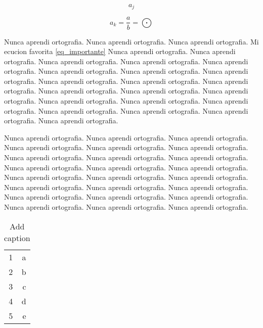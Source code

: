 \documentclass[13pt]{article}
\begin{document}
$$a_j$$

\begin{equation}
a_k = \frac{a}{b} = \bigodot
\label{eq_importante}
\end{equation}

        Nunca aprendi ortografia. Nunca aprendi ortografia. Nunca aprendi ortografia. Mi ecucion favorita \ref{eq_importante}
        Nunca aprendi ortografia. Nunca aprendi ortografia. Nunca aprendi ortografia.
        Nunca aprendi ortografia. Nunca aprendi ortografia. Nunca aprendi ortografia.
        Nunca aprendi ortografia. Nunca aprendi ortografia. Nunca aprendi ortografia.
        Nunca aprendi ortografia. Nunca aprendi ortografia. Nunca aprendi ortografia.
        Nunca aprendi ortografia. Nunca aprendi ortografia. Nunca aprendi ortografia.
        Nunca aprendi ortografia. Nunca aprendi ortografia. Nunca aprendi ortografia.
        Nunca aprendi ortografia. Nunca aprendi ortografia. Nunca aprendi ortografia.

        Nunca aprendi ortografia. Nunca aprendi ortografia. Nunca aprendi ortografia.
        Nunca aprendi ortografia. Nunca aprendi ortografia. Nunca aprendi ortografia.
        Nunca aprendi ortografia. Nunca aprendi ortografia. Nunca aprendi ortografia.
        Nunca aprendi ortografia. Nunca aprendi ortografia. Nunca aprendi ortografia.
        Nunca aprendi ortografia. Nunca aprendi ortografia. Nunca aprendi ortografia.
        Nunca aprendi ortografia. Nunca aprendi ortografia. Nunca aprendi ortografia.
        Nunca aprendi ortografia. Nunca aprendi ortografia. Nunca aprendi ortografia.
        Nunca aprendi ortografia. Nunca aprendi ortografia. Nunca aprendi ortografia.





\begin{table}[htbp]
  \centering
  \caption{Add caption}
    \begin{tabular}{|r|r|}
    1     & a \\
    2     & b \\
    3     & c \\
    4     & d \\
    5     & e \\
    \end{tabular}%
  \label{tab:addlabel}%
\end{table}%
\end{document}
